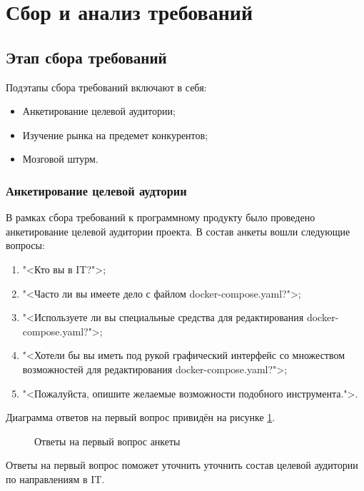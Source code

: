 \section{Сбор и анализ требований}
\subsection{Этап сбора требований}

\label{req:sect_1}

Подэтапы сбора требований включают в себя:

\begin{itemize}[wide]
    \item Анкетирование целевой аудитории;
    \item Изучение рынка на предемет конкурентов;
    \item Мозговой штурм.
\end{itemize}

\subsubsection{Анкетирование целевой аудтории}

В рамках сбора требований к программному продукту было проведено анкетирование целевой аудитории проекта. В состав анкеты вошли следующие вопросы:

\begin{enumerate}
    \item "<Кто вы в IT?">;
    \item "<Часто ли вы имеете дело с файлом docker-compose.yaml?">;
    \item "<Используете ли вы специальные средства для редактирования docker-compose.yaml?">;
    \item "<Хотели бы вы иметь под рукой графический интерфейс со множеством возможностей для редактирования docker-compose.yaml?">;
    \item "<Пожалуйста, опишите желаемые возможности подобного инструмента.">.
\end{enumerate}

Диаграмма ответов на первый вопрос привидён на рисунке \ref{req:first_q}.

\begin{figure}[H]
        \caption{Ответы на первый вопрос анкеты}
        \label{req:first_q}
\end{figure}

Ответы на первый вопрос поможет уточнить уточнить состав целевой аудитории по направлениям в IT.

